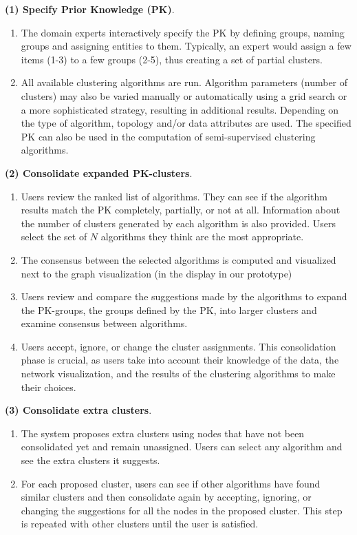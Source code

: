 \noindent \textbf{(1) Specify Prior Knowledge (PK)}.
\begin{enumerate}[left=.3em,nosep,label={\arabic*}.]
\item The domain experts interactively specify the PK by defining  groups, \ie naming groups and assigning entities to them.
Typically, an expert would assign a few items (1-3) to a few groups (2-5), thus creating a set of partial clusters.
\item All available clustering algorithms are run. Algorithm parameters (\eg number of clusters) may also be varied manually or automatically using a grid search or a more sophisticated strategy, resulting in additional results. Depending on the type of algorithm, topology and/or data attributes are used. The specified PK can also be used in the computation of semi-supervised clustering algorithms.
\end{enumerate}

\noindent \textbf{(2) Consolidate expanded PK-clusters}.
\begin{enumerate}[left=.3em,nosep,label={\arabic*}.,start=3]
\item Users review the ranked list of algorithms. They can see if the algorithm results match the PK completely, partially, or not at all. Information about the number of clusters generated by each algorithm is also provided.  Users select the set of $N$ algorithms they think are the most appropriate.
\item The consensus between the selected algorithms is computed and visualized next to the graph visualization  (in the \paovis display in our prototype)
\item Users review and compare the suggestions made by the algorithms to expand the PK-groups, \ie the groups defined by the PK, into larger clusters and examine consensus between algorithms.
\item Users accept, ignore, or change the cluster assignments. This consolidation phase is crucial, as users take into account their knowledge of the data, the network visualization, and the results of the clustering algorithms to make their choices.
\end{enumerate}

\noindent \textbf{(3) Consolidate extra clusters}.
\begin{enumerate}[left=.3em,nosep,label={\arabic*}.,start=7,itemindent=0pt]
\item The system proposes extra clusters using nodes that have not been consolidated yet and remain unassigned. Users can select any algorithm and see the extra clusters it suggests.
\item For each proposed cluster, users can see if other algorithms have found similar clusters and then consolidate again by accepting, ignoring, or changing the suggestions for all the nodes in the proposed cluster. This step is repeated with other clusters until the user is satisfied.
\end{enumerate}

